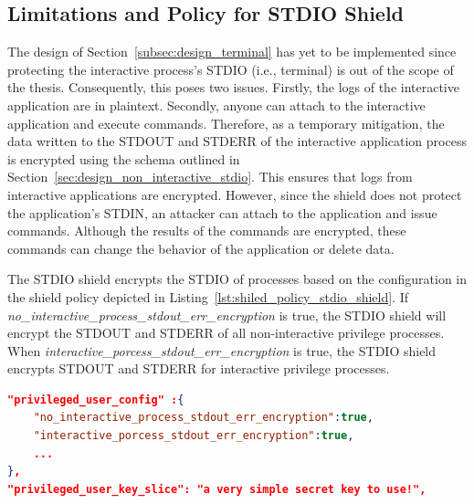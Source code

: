 \subsection{Limitations and Policy for STDIO Shield}
The design of Section~\ref{subsec:design_terminal} has yet to be implemented since protecting the interactive process's STDIO (i.e., terminal) is out of the scope of the thesis. Consequently, this poses two issues. Firstly, the logs of the interactive application are in plaintext. Secondly, anyone can attach to the interactive application and execute commands. 
Therefore, as a temporary mitigation, the data written to the STDOUT and STDERR of the interactive application process is encrypted using the schema outlined in Section~\ref{sec:design_non_interactive_stdio}. This ensures that logs from interactive applications are encrypted. However, since the shield does not protect the application's STDIN, an attacker can 
attach to the application and issue commands. Although the results of the commands are encrypted, these commands can change the behavior of the application or delete data.
 
The STDIO shield encrypts the STDIO of processes based on the configuration in the shield policy depicted in Listing~\ref{lst:shiled_policy_stdio_shield}. If \emph{no\_interactive\_process\_stdout\_err\_encryption} is true, the STDIO shield will encrypt the STDOUT and STDERR of all 
non-interactive privilege processes. When \emph{interactive\_porcess\_stdout\_err\_encryption} is true, the STDIO shield encrypts STDOUT and STDERR for interactive privilege processes.

\begin{lstlisting}[language=json, caption= STDIO shield's configuration in the shield policy, label={lst:shiled_policy_stdio_shield}]
"privileged_user_config" :{
    "no_interactive_process_stdout_err_encryption":true,
    "interactive_porcess_stdout_err_encryption":true,
    ...
},
"privileged_user_key_slice": "a very simple secret key to use!",
\end{lstlisting}


